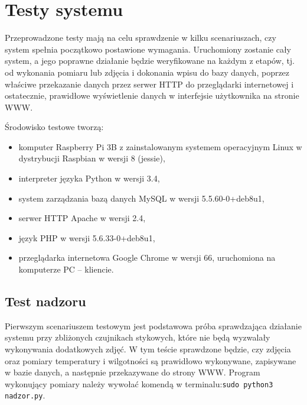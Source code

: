 \documentclass[a4paper,11pt,twoside]{article}
\begin{document}
\newpage
\section{Testy systemu}
Przeprowadzone testy mają na celu sprawdzenie w kilku scenariuszach, czy system spełnia początkowo postawione wymagania. Uruchomiony zostanie cały system, a jego poprawne działanie będzie weryfikowane na każdym z etapów, tj. od wykonania pomiaru lub zdjęcia i dokonania wpisu do bazy danych, poprzez właściwe przekazanie danych przez serwer HTTP do przeglądarki internetowej i ostatecznie, prawidłowe wyświetlenie danych w interfejsie użytkownika na stronie WWW.

Środowisko testowe tworzą:
\begin{itemize}
\item komputer Raspberry Pi 3B z zainstalowanym systemem operacyjnym Linux w dystrybucji Raspbian w wersji 8 (jessie), 
\item interpreter języka Python w wersji 3.4,
\item system zarządzania bazą danych MySQL w wersji 5.5.60-0+deb8u1,
\item serwer HTTP Apache w wersji 2.4,
\item język PHP w wersji 5.6.33-0+deb8u1,
\item przeglądarka internetowa Google Chrome w wersji 66, uruchomiona na komputerze PC -- kliencie.
\end{itemize}

\subsection{Test nadzoru}
Pierwszym scenariuszem testowym jest podstawowa próba sprawdzająca działanie systemu przy zbliżonych czujnikach stykowych, które nie będą wyzwalały wykonywania dodatkowych zdjęć. W tym teście sprawdzone będzie, czy zdjęcia oraz pomiary temperatury i wilgotności są prawidłowo wykonywane, zapisywane w bazie danych, a następnie przekazywane do strony WWW. Program wykonujący pomiary należy wywołać komendą w terminalu:\linebreak\texttt{sudo python3 nadzor.py}.
\end{document}
